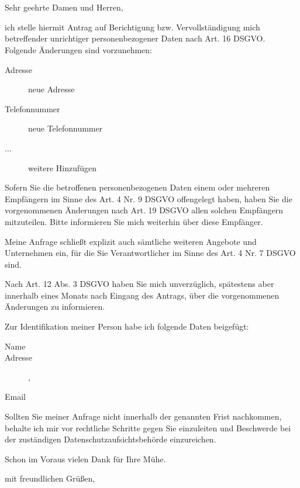 \documentclass[a4paper, pagenumber=footmiddle, parskip=half,
	foldmarks=true,foldmarks=BmT, fromalign=right,
	fromphone=false, fromfax=false, fromemail=true, fromurl=false, fromlogo=false,
	fromrule=false, version=last]{scrlttr2}
\begin{document}
\begin{letter}{
	\EmpfaengerName\\
	\EmpfaengerStrasse\\
	\EmpfaengerStadt
}
\flushleft
\opening{Sehr geehrte Damen und Herren,}

ich stelle hiermit Antrag auf Berichtigung bzw. Vervollständigung mich betreffender unrichtiger personenbezogener Daten nach Art. 16 DSGVO.\\

\vspace*{15mm}
Folgende Änderungen sind vorzunehmen:
\begin{description}
	\item[Adresse] neue Adresse
	\item[Telefonnummer] neue Telefonnummer
	\item[...] weitere Hinzufügen   
\end{description}
\vspace*{5mm}

Sofern Sie die betroffenen personenbezogenen Daten einem oder mehreren Empfängern im Sinne des Art. 4 Nr. 9 DSGVO offengelegt haben, haben Sie die vorgenommenen Änderungen nach Art. 19 DSGVO allen solchen Empfängern mitzuteilen. Bitte informieren Sie mich weiterhin über diese Empfänger.

Meine Anfrage schließt explizit auch sämtliche weiteren Angebote und Unternehmen ein, für die Sie Verantwortlicher im Sinne des Art. 4 Nr. 7 DSGVO sind.

Nach Art. 12 Abs. 3 DSGVO haben Sie mich unverzüglich, spätestens aber innerhalb eines Monats nach Eingang des Antrags, über die vorgenommenen Änderungen zu informieren.

\vspace*{15mm}
Zur Identifikation meiner Person habe ich folgende Daten beigefügt:
\begin{description}
	\item[Name] \meinName{}
	\item[Adresse] \meineStrasse{}, \meineStadt{}
	\item[Email] \meineEmail{}  
\end{description}
\vspace*{5mm}

Sollten Sie meiner Anfrage nicht innerhalb der genannten Frist nachkommen, behalte ich mir vor rechtliche Schritte gegen Sie einzuleiten und Beschwerde bei der zuständigen Datenschutzaufsichtsbehörde einzureichen.

Schon im Voraus vielen Dank für Ihre Mühe.


\closing{mit freundlichen Grüßen,}

\end{letter}
\end{document}
